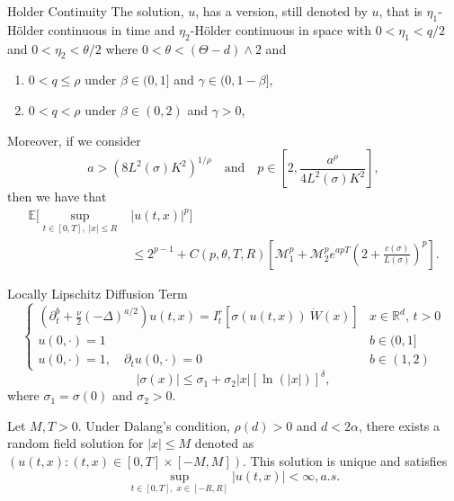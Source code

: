 \documentclass{beamer}%
\numberwithin{equation}{section}
\newcommand{\R}{\mathbb{R}}
\begin{document}
\begin{frame}{Holder Continuity}
	The solution, $u$, has a version, still denoted by $u$, that is $\eta_1$-H\"older continuous in time and $\eta_2$-H\"older continuous in space with $0<\eta_1 < q/2$ and $0<\eta_2 < \theta/2$ where $0< \theta < (\Theta - d) \wedge 2$ and \vspace{.1in}
	\begin{enumerate}
		\item $0< q \le \rho$ under $\beta \in (0,1]$ and $\gamma \in (0, 1-\beta]$,
		\item $0 < q < \rho$ under $\beta \in (0,2)$ and $\gamma >0$, \vspace{.1in}
	\end{enumerate}
Moreover, if we consider
\[
a > \left( 8 L^2(\sigma)K^2\right)^{1/\rho} \quad \text{and} \quad 	p \in \left[ 2, \frac{a^{\rho}}{4L^2(\sigma)K^2} \right],
\]
then we have that 
\begin{align*}
\mathbb{E}\bigg[ \sup_{t\in[0,T],\; |x| \le R} & |u(t,x)|^p \bigg] \\ 
&\le 2^{p-1} + C(p, \theta, T,R) \left[ \mathcal{M}_1^p + \mathcal{M}_2^p e^{apT} \left(2 +  \frac{c(\sigma)}{L(\sigma)}\right)^p\right].
\end{align*}
	
\end{frame}

\begin{frame}{Locally Lipschitz Diffusion Term}
	\begin{equation*}
	\begin{cases}
	\left(\partial^b_t + \frac{\nu}{2}(-\Delta)^{a/2}\right) u(t,x) = I^r_t \left[\sigma(u(t,x))\: \dot W(x) \right] & \text{$x\in \R^d$, $t>0$} \\
	u(0,\cdot) = 1                                                                                                           & b \in (0,1]               \\
	u(0,\cdot) = 1, \quad \partial_t u(0,\cdot) = 0                                                                          & b \in (1,2)
	\end{cases}
	\end{equation*}
	\[
		|\sigma(x)| \le \sigma_1 + \sigma_2|x|[\ln(|x|)]^{\delta},
	\]
	where $\sigma_1 = \sigma(0)$ and $\sigma_2 >0$.
	
		\begin{theorem}
	 Let $M, T>0$. Under Dalang's condition, $\rho(d)>0$ and $d < 2\alpha$,  there exists a random field solution for $|x| \le M$ denoted as $(u(t,x): (t,x) \in [0,T]\times[-M,M])$. This solution is unique and satisfies 
		\begin{equation*}
		\sup_{t\in[0,T],\; x\in[-R,R]} |u(t,x)| < \infty, a.s.
		\end{equation*}
	\end{theorem}
\end{frame}
\end{document}
